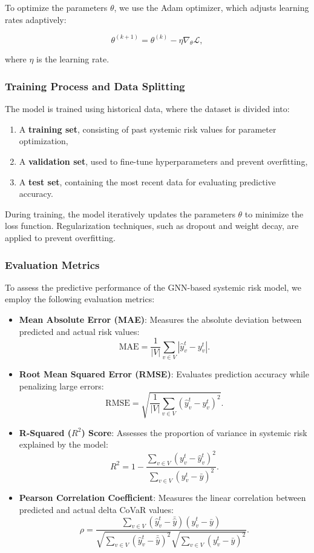 \documentclass[preprint,12pt,authoryear]{elsarticle}
\begin{document}
To optimize the parameters \( \theta \), we use the Adam optimizer, which adjusts learning rates adaptively:

\[
\theta^{(k+1)} = \theta^{(k)} - \eta \nabla_{\theta} \mathcal{L},
\]

where \( \eta \) is the learning rate.

\subsubsection{Training Process and Data Splitting}  

The model is trained using historical data, where the dataset is divided into:
\begin{enumerate}
    \item A \textbf{training set}, consisting of past systemic risk values for parameter optimization,
    \item A \textbf{validation set}, used to fine-tune hyperparameters and prevent overfitting,
    \item A \textbf{test set}, containing the most recent data for evaluating predictive accuracy.
\end{enumerate}

During training, the model iteratively updates the parameters \( \theta \) to minimize the loss function. Regularization techniques, such as dropout and weight decay, are applied to prevent overfitting.

\subsubsection{Evaluation Metrics}  

To assess the predictive performance of the GNN-based systemic risk model, we employ the following evaluation metrics:

\begin{itemize}
    \item \textbf{Mean Absolute Error (MAE)}: Measures the absolute deviation between predicted and actual risk values:
    \[
    \text{MAE} = \frac{1}{|V|} \sum_{v \in V} \left| \hat{y}_v^t - y_v^t \right|.
    \]

    \item \textbf{Root Mean Squared Error (RMSE)}: Evaluates prediction accuracy while penalizing large errors:
    \[
    \text{RMSE} = \sqrt{\frac{1}{|V|} \sum_{v \in V} \left( \hat{y}_v^t - y_v^t \right)^2}.
    \]

    \item \textbf{R-Squared (\( R^2 \)) Score}: Assesses the proportion of variance in systemic risk explained by the model:
    \[
    R^2 = 1 - \frac{\sum_{v \in V} (y_v^t - \hat{y}_v^t)^2}{\sum_{v \in V} (y_v^t - \bar{y})^2}.
    \]

    \item \textbf{Pearson Correlation Coefficient}: Measures the linear correlation between predicted and actual delta CoVaR values:
    \[
    \rho = \frac{\sum_{v \in V} (\hat{y}_v^t - \bar{\hat{y}}) (y_v^t - \bar{y})}{\sqrt{\sum_{v \in V} (\hat{y}_v^t - \bar{\hat{y}})^2} \sqrt{\sum_{v \in V} (y_v^t - \bar{y})^2}}.
    \]
\end{itemize}
\end{document}
